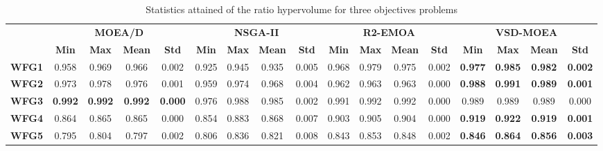 \begin{table*}[t]
\caption{Statistics attained of the ratio hypervolume for three objectives problems}
\label{tab:StatisticsHV_3obj}
\centering
\begin{scriptsize}
\begin{tabular}{cc|c|c|c|c|c|c|c|c|c|c|c|c|c|c|c}
\cline{2-17}
                                    & \multicolumn{4}{c|}{\textbf{MOEA/D}}                              & \multicolumn{4}{c|}{\textbf{NSGA-II}}                      & \multicolumn{4}{c|}{\textbf{R2-EMOA}}                             & \multicolumn{4}{c}{\textbf{VSD-MOEA}}                            \\ \cline{2-17} 
                                    & \textbf{Min}   & \textbf{Max}   & \textbf{Mean}  & \textbf{Std}   & \textbf{Min} & \textbf{Max} & \textbf{Mean} & \textbf{Std} & \textbf{Min}   & \textbf{Max}   & \textbf{Mean}  & \textbf{Std}   & \textbf{Min}   & \textbf{Max}   & \textbf{Mean}  & \textbf{Std}   \\ \hline
\multicolumn{1}{c|}{\textbf{WFG1}}  & 0.958          & 0.969          & 0.966          & 0.002          & 0.925        & 0.945        & 0.935         & 0.005        & 0.968          & 0.979          & 0.975          & 0.002          & \textbf{0.977} & \textbf{0.985} & \textbf{0.982} & \textbf{0.002} \\ \hline
\multicolumn{1}{c|}{\textbf{WFG2}}  & 0.973          & 0.978          & 0.976          & 0.001          & 0.959        & 0.974        & 0.968         & 0.004        & 0.962          & 0.963          & 0.963          & 0.000          & \textbf{0.988} & \textbf{0.991} & \textbf{0.989} & \textbf{0.001} \\ \hline
\multicolumn{1}{c|}{\textbf{WFG3}}  & \textbf{0.992} & \textbf{0.992} & \textbf{0.992} & \textbf{0.000} & 0.976        & 0.988        & 0.985         & 0.002        & 0.991          & 0.992          & 0.992          & 0.000          & 0.989          & 0.989          & 0.989          & 0.000          \\ \hline
\multicolumn{1}{c|}{\textbf{WFG4}}  & 0.864          & 0.865          & 0.865          & 0.000          & 0.854        & 0.883        & 0.868         & 0.007        & 0.903          & 0.905          & 0.904          & 0.000          & \textbf{0.919} & \textbf{0.922} & \textbf{0.919} & \textbf{0.001} \\ \hline
\multicolumn{1}{c|}{\textbf{WFG5}}  & 0.795          & 0.804          & 0.797          & 0.002          & 0.806        & 0.836        & 0.821         & 0.008        & 0.843          & 0.853          & 0.848          & 0.002          & \textbf{0.846} & \textbf{0.864} & \textbf{0.856} & \textbf{0.003} \\ \hline

\end{tabular}
\end{scriptsize}
\end{table*}
